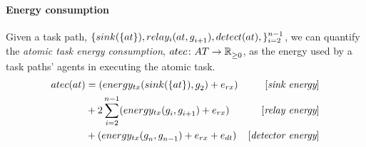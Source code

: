 \paragraph{Energy consumption}
\label{section:energy_consumption}

Given a task path, $\lbrace \functionSinkRoleAtomic{}{}, \functionRelayRole{i}{}{i+1}, \functionDetectorRole{}{},  \rbrace_{i=2}^{n-1}$, 
we can quantify the \textit{atomic task energy consumption}, $\formalAtomicTaskEnergyConsumption{}{}$, as the energy used by a task paths' agents in executing the atomic task. 
\begin{equation}
\begin{aligned}
	\functionAtomicTaskEnergyConsumptionSignature{}{} 
	&= (\functionTransmissionEnergySink{}{} + \varReceiverEnergy{}{}) & [\textit{sink energy}]\\
	& + 2 \sum_{i=2}^{n-1} (\functionTransmissionEnergyRelay{i}{i+1} + \varReceiverEnergy{}{} )
	 & [\textit{relay energy}]\\
	&+ (
		\functionTransmissionEnergyDetector{n}{n-1}
		+ \varReceiverEnergy{}{}
		+ \varSensorEnergy{}{}
		)& [\textit{detector energy}]
\end{aligned}
\end{equation}

